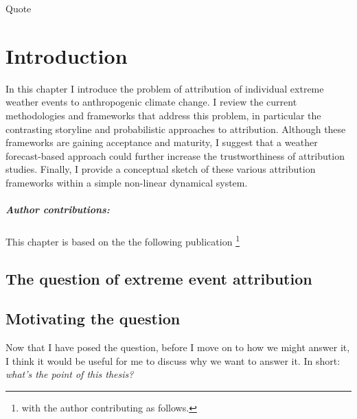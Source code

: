 \begin{savequote}[8cm]
    Quote
\end{savequote}
    
\chapter{\label{intro}Introduction} 

In this chapter I introduce the problem of attribution of individual extreme weather events to anthropogenic climate change. I review the current methodologies and frameworks that address this problem, in particular the contrasting storyline and probabilistic approaches to attribution. Although these frameworks are gaining acceptance and maturity, I suggest that a weather forecast-based approach could further increase the trustworthiness of attribution studies. Finally, I provide a conceptual sketch of these various attribution frameworks within a simple non-linear dynamical system.
\small\paragraph{Author contributions:} This chapter is based on the the following publication \footnote{with the author contributing as follows.} \par\vspace{1em}

\minitoc

\clearpage

\section{The question of extreme event attribution}

  \blindtext

\section{Motivating the question}

  Now that I have posed the question, before I move on to how we might answer it, I think it would be useful for me to discuss why we want to answer it. In short: \emph{what's the point of this thesis?}

